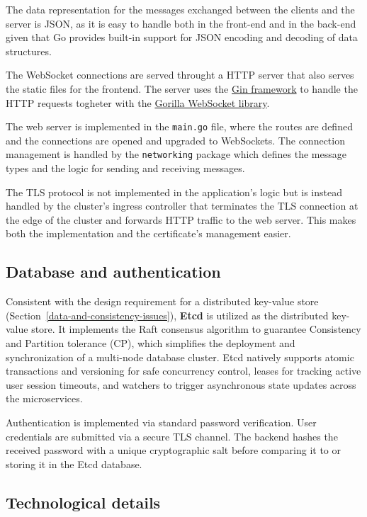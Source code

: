 \documentclass{scrartcl}
\begin{document}
The data representation for the messages exchanged between the clients and the server is JSON,
as it is easy to handle both in the front-end and in the back-end given that Go provides 
built-in support for JSON encoding and decoding of data structures.

The WebSocket connections are served throught a HTTP server that also serves the static files for the
frontend. The server uses the \href{https://gin-gonic.com/}{Gin framework} to handle the HTTP requests
togheter with the \href{https://github.com/gorilla/websocket}{Gorilla WebSocket library}.

The web server is implemented in the \texttt{main.go} file, where the routes are defined and the connections
are opened and upgraded to WebSockets. The connection management is handled by the \texttt{networking} package
which defines the message types and the logic for sending and receiving messages.

The TLS protocol is not implemented in the application's logic but is instead handled by the cluster's
ingress controller that terminates the TLS connection at the edge of the cluster and forwards HTTP traffic
to the web server. This makes both the implementation and the certificate's management easier.

\subsection*{Database and authentication}
Consistent with the design requirement for a distributed key-value store (Section~\ref{data-and-consistency-issues}), \textbf{Etcd} is utilized as the distributed key-value store. It implements the Raft consensus algorithm to guarantee Consistency and Partition tolerance (CP), which simplifies the deployment and synchronization of a multi-node database cluster. Etcd natively supports atomic transactions and versioning for safe concurrency control, leases for tracking active user session timeouts, and watchers to trigger asynchronous state updates across the microservices.

Authentication is implemented via standard password verification. User credentials are submitted via a secure TLS channel. The backend hashes the received password with a unique cryptographic salt before comparing it to or storing it in the Etcd database.

\subsection{Technological details}\label{technological-details}
\end{document}
